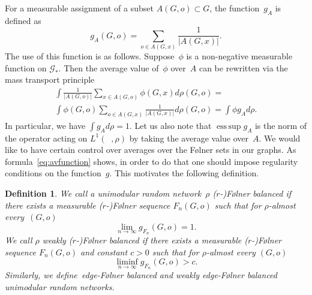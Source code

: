 \documentclass[10pt,a4paper]{amsart}
\newtheorem{definition}[lemma]{Definition}
\DeclareMathOperator{\esssup}{ess\,sup} %
\DeclareMathOperator{\Gr}{{\mathcal{G}_*}}
\begin{document}
For a measurable assignment of a subset $A(G,o) \subset G$, the function~$g_A$ is defined as
\begin{equation}\label{definition:g_function}
    g_A(G,o) = \sum\limits_{o \in A(G, x)} \frac{1}{|A(G,x)|}.
\end{equation}
The use of this function is as follows. Suppose~$\phi$ is a non-negative measurable function on $\mathcal{G_*}$. Then the average value of~$\phi$ over~$A$ can be rewritten via the mass transport principle 
\begin{multline}\label{eq:avfunction}
    \int \frac{1}{|A(G,o)|} \sum_{x \in A(G,o)} \phi(G,x) d\rho(G,o) = \\ \int \phi(G,o) \sum_{o \in A(G,x)} \frac{1}{|A(G,x)|} d\rho(G,o) = \int \phi g_A d\rho.
\end{multline}
In particular, we have $\int g_A d \rho= 1$. Let us also note that $\esssup g_A$ is the norm of the operator acting on $L^1(\Gr, \rho)$ by taking the average value over~$A$. We would like to have certain control over averages over the F\o lner sets in our graphs. As formula~\eqref{eq:avfunction} shows,  in order to do that one should impose regularity conditions on the function~$g$. This motivates the following definition.
\begin{definition}
    We call a unimodular random network~$\rho$ ($r$-)\emph{{F\o lner} balanced} if there exists a measurable ($r$-)F\o lner sequence $F_n(G,o)$ such that for $\rho$-almost every~$(G,o)$
    $$
    \lim_{n \to \infty} g_{F_n}(G,o)  = 1. 
    $$
    We call $\rho$ \emph{weakly} ($r$-)\emph{{F\o lner} balanced} if there exists a measurable ($r$-)F\o lner sequence $F_n(G,o)$ and constant $c > 0$ such that for $\rho$-almost every $(G,o)$ 
    $$
     \liminf_{n\to \infty}g_{F_n}(G,o) > c. 
    $$  
     Similarly, we define~\emph{edge-{F\o lner} balanced} and \emph{weakly edge-{F\o lner} balanced} unimodular random networks.
\end{definition}
   
\end{document}
